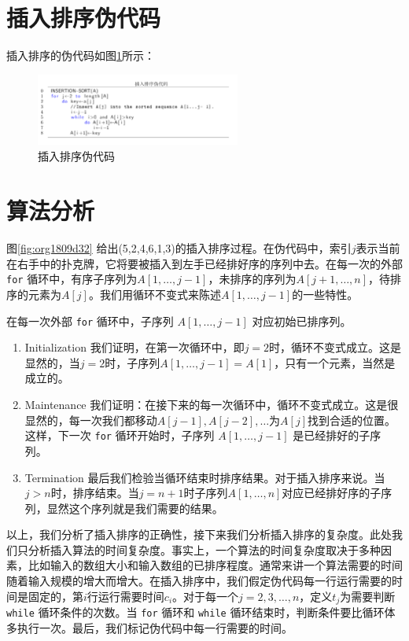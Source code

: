 \documentclass[10pt,a4paper,UTF8]{article}
\begin{document}
\section{插入排序伪代码}
\label{sec:org301b519}


插入排序的伪代码如图\ref{fig:orgc8a3b3b}所示：

\begin{figure}[htbp]
\centering
\includegraphics[width=0.6\textwidth]{../../img/computer_algorithms/20170702insertionSortPseudoCode.png}
\caption{\label{fig:orgc8a3b3b}
插入排序伪代码}
\end{figure}
\section{算法分析}
\label{sec:orgdbcae43}


图\ref{fig:org1809d32} 给出(5,2,4,6,1,3)的插入排序过程。在伪代码中，索引\(j\)表示当前在右手中的扑克牌，它将要被插入到左手已经排好序的序列中去。在每一次的外部 \texttt{for} 循环中，有序子序列为\(A[1,\ldots,j-1]\)，未排序的序列为\(A[j+1,\ldots,n]\)，待排序的元素为\(A[j]\)。我们用循环不变式来陈述\(A[1,\ldots,j-1]\)的一些特性。

在每一次外部 \texttt{for} 循环中，子序列 \(A[1,\ldots,j-1]\) 对应初始已排序列。

\begin{enumerate}
\item Initialization 我们证明，在第一次循环中，即\(j=2\)时，循环不变式成立。这是显然的，当\(j=2\)时，子序列\(A[1,\ldots,j-1]=A[1]\)，只有一个元素，当然是成立的。
\item Maintenance 我们证明：在接下来的每一次循环中，循环不变式成立。这是很显然的，每一次我们都移动\(A[j-1],A[j-2],\ldots\)为\(A[j]\)找到合适的位置。这样，下一次 \texttt{for} 循环开始时，子序列 \(A[1,\ldots,j-1]\) 是已经排好的子序列。
\item Termination 最后我们检验当循环结束时排序结果。对于插入排序来说。当\(j > n\)时，排序结束。当\(j=n+1\)时子序列\(A[1,\ldots,n]\)对应已经排好序的子序列，显然这个序列就是我们需要的结果。
\end{enumerate}

以上，我们分析了插入排序的正确性，接下来我们分析插入排序的复杂度。此处我们只分析插入算法的时间复杂度。事实上，一个算法的时间复杂度取决于多种因素，比如输入的数组大小和输入数组的已排序程度。通常来讲一个算法需要的时间随着输入规模的增大而增大。在插入排序中，我们假定伪代码每一行运行需要的时间是固定的，第\(i\)行运行需要时间\(c_i\)。对于每一个\(j=2,3,\ldots,n\)，定义\(t_j\)为需要判断 \texttt{while} 循环条件的次数。当 \texttt{for} 循环和 \texttt{while} 循环结束时，判断条件要比循环体多执行一次。最后，我们标记伪代码中每一行需要的时间。
\end{document}
